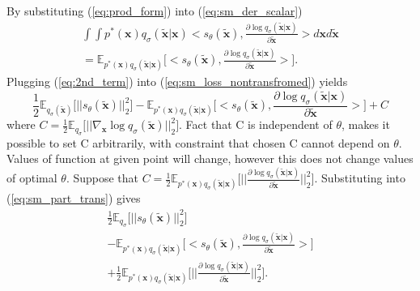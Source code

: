 \documentclass[10pt]{article}
\begin{document}
By substituting (\ref{eq:prod_form}) into (\ref{eq:sm_der_scalar})
\begin{gather}
    \int \int p^*(\textbf{x} )  q_{\sigma}(\tilde{\textbf{x}} | \textbf{x})  
    < s_{\theta}(\tilde{\textbf{x}}),  \frac{\partial \log q_{\sigma}(\tilde{\textbf{x}} | \textbf{x})}  {\partial \tilde{\textbf{x}}} > d\textbf{x}  d\tilde{\textbf{x}} \\
    = \label{eq:2nd_term} 
    \mathbb{E}_{ p^*(\textbf{x} )  q_{\sigma}(\tilde{\textbf{x}} | \textbf{x}) }
    \Big[
    < s_{\theta}(\tilde{\textbf{x}}),  \frac{\partial \log q_{\sigma}(\tilde{\textbf{x}} | \textbf{x})}  {\partial \tilde{\textbf{x}}} > 
    \Big].
\end{gather}
Plugging (\ref{eq:2nd_term}) into (\ref{eq:sm_loss_nontransfromed}) yields
\begin{equation}
\label{eq:sm_part_trans}
    \frac{1}{2} \mathbb{E}_{q_{\sigma}( \tilde{\textbf{x}} ) } \Big[ ||  s_{\theta}(\tilde{\textbf{x}} )||_2^2 \Big]  - 
    \mathbb{E}_{ p^*(\textbf{x} )  q_{\sigma}(\tilde{\textbf{x}} | \textbf{x}) }
    \Big[
    < s_{\theta}(\tilde{\textbf{x}}),  \frac{\partial \log q_{\sigma}(\tilde{\textbf{x}} | \textbf{x})}  {\partial \tilde{\textbf{x}}} > 
    \Big] + C
\end{equation}
where $C = \frac{1}{2}\mathbb{E}_{q_{\sigma} } \Big[ ||\nabla_{\textbf{x}} \log q_{\sigma}( \tilde{\textbf{x} }) ||_2^2 \Big] $. 
Fact that C is independent of $\theta$, makes it possible to set C arbitrarily, with constraint that chosen C cannot depend on $\theta$. Values of function at given point will change, however this does not change values of optimal $\theta$.
Suppose that
$C = \frac{1}{2}\mathbb{E}_{ p^*(\textbf{x} )  q_{\sigma}(\tilde{\textbf{x}} | \textbf{x}) }
\Big[ || \frac{\partial \log q_{\sigma}(\tilde{\textbf{x}} | \textbf{x})}  {\partial \tilde{\textbf{x}}}||_2^2 \Big]$. Substituting into (\ref{eq:sm_part_trans}) gives
\begin{equation}
\label{eq:sm_loss_almost_there}
\begin{gathered}
    \frac{1}{2} \mathbb{E}_{q_{\sigma} } \Big[ ||  s_{\theta}(\tilde{\textbf{x}})||_2^2 \Big] \\
    - \mathbb{E}_{ p^*(\textbf{x} )  q_{\sigma}(\tilde{\textbf{x}} | \textbf{x}) }
    \Big[
    < s_{\theta}(\tilde{\textbf{x}}),  \frac{\partial \log q_{\sigma}(\tilde{\textbf{x}} | \textbf{x})}  {\partial \tilde{\textbf{x}}} > 
    \Big] \\
    + \frac{1}{2}\mathbb{E}_{ p^*(\textbf{x} )  q_{\sigma}(\tilde{\textbf{x}} | \textbf{x}) }
\Big[ || \frac{\partial \log q_{\sigma}(\tilde{\textbf{x}} | \textbf{x})}  {\partial \tilde{\textbf{x}}}||_2^2 \Big].
\end{gathered}
\end{equation}
\end{document}
